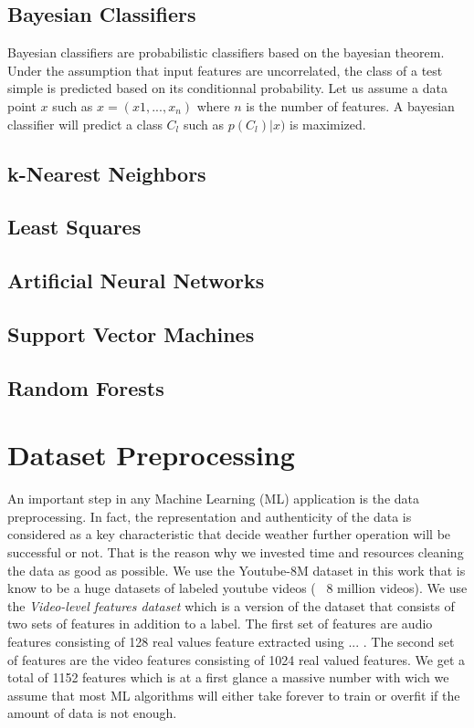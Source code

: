 \documentclass{article}
\begin{document}
\subsection{Bayesian Classifiers}
Bayesian classifiers are probabilistic classifiers based on the bayesian theorem. Under the assumption that input features are uncorrelated, the class of a test simple is predicted based on its conditionnal probability. Let us assume a data point $x$ such as $x = (x{1},...,x_{n})$ where $n$ is the number of features. A bayesian classifier will predict a class $C_{l}$ such as $p(C_{l})|x)$ is maximized. 

\subsection{k-Nearest Neighbors}

\subsection{Least Squares}

\subsection{Artificial Neural Networks}

\subsection{Support Vector Machines}

\subsection{Random Forests}

\section{Dataset Preprocessing}
An important step in any Machine Learning (ML) application is the data preprocessing. In fact, the representation and authenticity of the data is considered as a key characteristic that decide weather further operation will be successful or not. That is the reason why we invested time and resources cleaning the data as good as possible. We use the Youtube-8M dataset in this work \cite{} that is know to be a huge datasets of labeled youtube videos (~ 8 million videos). 
We use the \emph{Video-level features dataset} which is a version of the dataset that consists of two sets of features in addition to a label. The first set of features are audio features consisting of 128 real values feature extracted using ... . The second set of features are the video features consisting of 1024 real valued features. We get a total of 1152 features which is at a first glance a massive number with wich we assume that most ML algorithms will either take forever to train or overfit if the amount of data is not enough.
\end{document}
